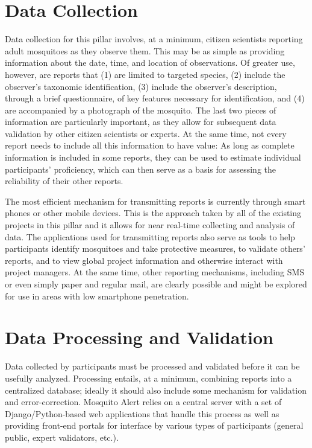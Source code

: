 \documentclass[]{article}
\begin{document}
\hypertarget{data-collection}{%
\section{Data Collection}\label{data-collection}}

Data collection for this pillar involves, at a minimum, citizen scientists reporting adult mosquitoes as they observe them. This may be as simple as providing information about the date, time, and location of observations. Of greater use, however, are reports that (1) are limited to targeted species, (2) include the observer's taxonomic identification, (3) include the observer's description, through a brief questionnaire, of key features necessary for identification, and (4) are accompanied by a photograph of the mosquito. The last two pieces of information are particularly important, as they allow for subsequent data validation by other citizen scientists or experts. At the same time, not every report needs to include all this information to have value: As long as complete information is included in some reports, they can be used to estimate individual participants' proficiency, which can then serve as a basis for assessing the reliability of their other reports.

The most efficient mechanism for transmitting reports is currently through smart phones or other mobile devices. This is the approach taken by all of the existing projects in this pillar and it allows for near real-time collecting and analysis of data. The applications used for transmitting reports also serve as tools to help participants identify mosquitoes and take protective measures, to validate others' reports, and to view global project information and otherwise interact with project managers. At the same time, other reporting mechanisms, including SMS or even simply paper and regular mail, are clearly possible and might be explored for use in areas with low smartphone penetration.

\hypertarget{data-processing-and-validation}{%
\section{Data Processing and Validation}\label{data-processing-and-validation}}

Data collected by participants must be processed and validated before it can be usefully analyzed. Processing entails, at a minimum, combining reports into a centralized database; ideally it should also include some mechanism for validation and error-correction. Mosquito Alert relies on a central server with a set of Django/Python-based web applications that handle this process as well as providing front-end portals for interface by various types of participants (general public, expert validators, etc.).
\end{document}
